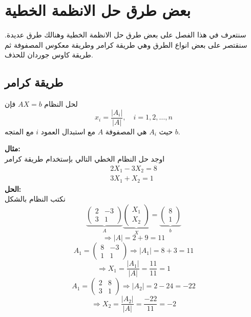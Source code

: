 \chapter{بعض طرق حل الانظمة الخطية}

سنتعرف في هذا الفصل على بعض طرق حل الانظمة الخطية وهنالك طرق عديدة. سنقتصر على بعض انواع الطرق وهي طريقة كرامر وطريقة معكوس المصفوفة ثم طريقة كاوس جوردان للحذف.

\section[طريقة كرامر]{طريقة كرامر}
لحل النظام $AX=b$ فإن 
\[
x_i = \frac{|A_i|}{|A|}, \quad i = 1,2,\dots,n
\]
حيث $A_i$ هي المصفوفة $A$ مع استبدال العمود $i$ مع المتجه $b$.

\noindent
\textbf{مثال:}\\ \noindent
 اوجد حل النظام الخطي التالي بإستخدام طريقة كرامر
\begin{align*}
	2X_1 - 3X_2 =8\\
	3X_1 + X_2 =1
\end{align*}
\noindent
\textbf{الحل:}\\ \noindent
نكتب النظام بالشكل
\[
\underbrace{
\begin{pmatrix}
	2&-3\\
	3&1
\end{pmatrix}}_{A}
\underbrace{
\begin{pmatrix}
	X_1\\X_2
\end{pmatrix}}_{X}
=
\underbrace{
\begin{pmatrix}
	8\\1
\end{pmatrix}}_{b}
\]
\[
\Rightarrow |A| = 2+9=11
\]
\[
A_1 =
\begin{pmatrix}
	8&-3\\
	1&1
\end{pmatrix}
\Rightarrow |A_1| = 8+3=11
\]
\[
\Rightarrow X_1 = \frac{|A_1|}{|A|} = \frac{11}{11}=1
\]
\[
A_1 =
\begin{pmatrix}
	2&8\\
	3&1
\end{pmatrix}
\Rightarrow |A_2| = 2-24=-22
\]
\[
\Rightarrow X_2 = \frac{|A_2|}{|A|} = \frac{-22}{11} = -2
\]

